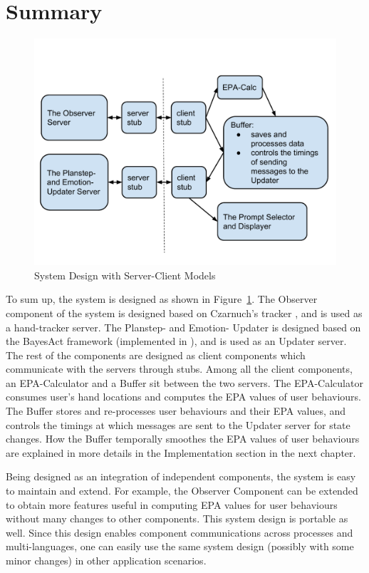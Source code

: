 \section{Summary}

\begin{figure}[h!]
\centering
\includegraphics[width=0.9\linewidth]{fig-system.pdf}
\caption{System Design with Server-Client Models}
\label{fig:system}
\end{figure}

To sum up, the system is designed as shown in Figure~\ref{fig:system}. The Observer component of the system is designed based on Czarnuch's tracker \cite{czarnuch2014}, and is used as a hand-tracker server. The Planstep- and Emotion- Updater is designed based on the BayesAct framework (implemented in \cite{hoey2013bayesian}), and is used as an Updater server. The rest of the components are designed as client components which communicate with the servers through stubs. Among all the client components, an EPA-Calculator and a Buffer sit between the two servers. The EPA-Calculator consumes user's hand locations and computes the EPA values of user behaviours. The Buffer stores and re-processes user behaviours and their EPA values, and controls the timings at which messages are sent to the Updater server for state changes. How the Buffer temporally smoothes the EPA values of user behaviours are explained in more details in the Implementation section in the next chapter.

Being designed as an integration of independent components, the system is easy to maintain and extend. For example, the Observer Component can be extended to obtain more features useful in computing EPA values for user behaviours without many changes to other components. This system design is portable as well. Since this design enables component communications across processes and multi-languages, one can easily use the same system design (possibly with some minor changes) in other application scenarios.


